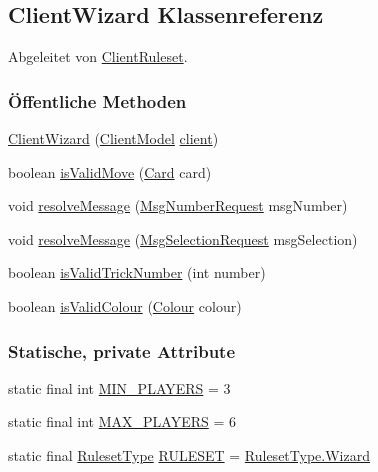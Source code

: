 \hypertarget{a00057}{\subsection{Client\-Wizard Klassenreferenz}
\label{a00057}
}


Abgeleitet von \hyperlink{a00056}{Client\-Ruleset}.

\subsubsection*{Öffentliche Methoden}
\begin{DoxyCompactItemize}
\item 
\hyperlink{a00057_a7944dd841fd8985fe49d9e2d52f36b0f}{Client\-Wizard} (\hyperlink{a00003}{Client\-Model} \hyperlink{a00056_a937cb3d928d5cde5863e895e163b048e}{client})
\item 
boolean \hyperlink{a00057_aa58080772a961e1f9f88d766777f82ed}{is\-Valid\-Move} (\hyperlink{a00054}{Card} card)
\item 
void \hyperlink{a00057_a346a9e356e52aa231aab7a309f7cf69f}{resolve\-Message} (\hyperlink{a00049}{Msg\-Number\-Request} msg\-Number)
\item 
void \hyperlink{a00057_a06db25d7d363bc633009a8722a797cc3}{resolve\-Message} (\hyperlink{a00051}{Msg\-Selection\-Request} msg\-Selection)
\item 
boolean \hyperlink{a00057_a34e8cc2994c9799ec78964834e470228}{is\-Valid\-Trick\-Number} (int number)
\item 
boolean \hyperlink{a00057_ae9116e1fb048aebeb428ffaf62599d69}{is\-Valid\-Colour} (\hyperlink{a00058}{Colour} colour)
\end{DoxyCompactItemize}
\subsubsection*{Statische, private Attribute}
\begin{DoxyCompactItemize}
\item 
\hypertarget{a00057_a57fe2c01c4e61b1f0c44c70ccc75d903}{static final int \hyperlink{a00057_a57fe2c01c4e61b1f0c44c70ccc75d903}{M\-I\-N\-\_\-\-P\-L\-A\-Y\-E\-R\-S} = 3}\label{a00057_a57fe2c01c4e61b1f0c44c70ccc75d903}

\item 
\hypertarget{a00057_ae6ed433235a83c520ce79bee49bc2b01}{static final int \hyperlink{a00057_ae6ed433235a83c520ce79bee49bc2b01}{M\-A\-X\-\_\-\-P\-L\-A\-Y\-E\-R\-S} = 6}\label{a00057_ae6ed433235a83c520ce79bee49bc2b01}

\item 
\hypertarget{a00057_a3045f525de18ff0ad68134f0d512ea16}{static final \hyperlink{a00066}{Ruleset\-Type} \hyperlink{a00057_a3045f525de18ff0ad68134f0d512ea16}{R\-U\-L\-E\-S\-E\-T} = \hyperlink{a00066_a35e49e93bdb15f20f8e9940d3f54c887}{Ruleset\-Type.\-Wizard}}\label{a00057_a3045f525de18ff0ad68134f0d512ea16}

\end{DoxyCompactItemize}
